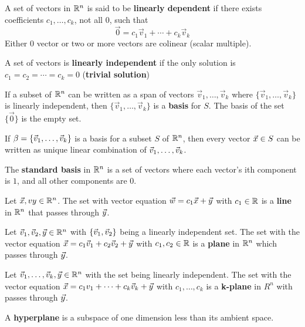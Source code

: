 \documentclass[english, 12pt]{article}
\begin{document}
\begin{defn}
A set of vectors in ${\mathbb{R}}^n$ is said to be \textbf{linearly dependent} if there exists coefficients $c_{1},\dots,c_{k}$, not all $0$, such that
\[\vec{0} = c_{1} \vec{v}_{1} + \cdots + c_{k} \vec{v}_{k}\]
Either $0$ vector or two or more vectors are colinear (scalar multiple).
\end{defn}
\begin{defn}
A set of vectors is \textbf{linearly independent} if the only solution is $c_{1} = c_{2} = \cdots = c_{k} = 0$ (\textbf{trivial solution})
\end{defn}

\begin{defn}
If a subset of ${\mathbb{R}}^n$ can be written as a span of vectors $\vec{v}_{1},\dots,\vec{v}_{k}$ where $\{\vec{v}_{1},\dots,\vec{v}_{k}\}$ is linearly independent, then $\{\vec{v}_{1},\dots,\vec{v}_{k}\}$ is a \textbf{basis} for $S$. The basis of the set $\{\vec{0}\}$ is the empty set.
\end{defn}

\begin{thrm}
If $\beta= \{\vec{v}_{1},\dots,\vec{v}_{k}\}$ is a basis for a subset $S$ of ${\mathbb{R}}^n$, then every vector $\vec{x} \in S$ can be written as unique linear combination of $\vec{v}_{1},\dots,\vec{v}_{k}$.
\end{thrm}
\begin{defn}
The \textbf{standard basis} in ${\mathbb{R}}^n$ is a set of vectors where each vector's ith component is $1$, and all other components are $0$.
\end{defn}
\begin{defn}
Let $\vec{x},vy \in {\mathbb{R}}^n$. The set with vector equation $\vec{w} = c_{1} \vec{x} + \vec{y}$ with $ c_{1} \in {\mathbb{R}}$ is a \textbf{line} in ${\mathbb{R}}^n$ that passes through $\vec{y}$.
\end{defn}
\begin{defn}
Let $\vec{v}_{1},\vec{v}_{2},\vec{y} \in {\mathbb{R}}^n$ with $\{\vec{v}_{1},\vec{v}_{2}\}$ being a linearly independent set. The set with the vector equation $\vec{x} = c_{1} \vec{v}_{1} + c_{2} \vec{v}_{2} + \vec{y}$ with $c_{1},c_{2} \in {\mathbb{R}}$ is a \textbf{plane} in ${\mathbb{R}}^n$ which passes through $\vec{y}$.
\end{defn}
\begin{defn}
Let $\vec{v}_{1},\dots,\vec{v}_{k},\vec{y} \in {\mathbb{R}}^n$ with the set being linearly independent. The set with the vector equation $\vec{x} = c_{1} v_{1} + \cdots + c_{k} \vec{v}_{k} + \vec{y}$ with $c_{1},\dots,c_{k}$ is a \textbf{k-plane} in $R^n$ with passes through $\vec{y}$.
\end{defn}
\begin{defn}
A \textbf{hyperplane} is a subspace of one dimension less than its ambient space.
\end{defn}
\end{document}
